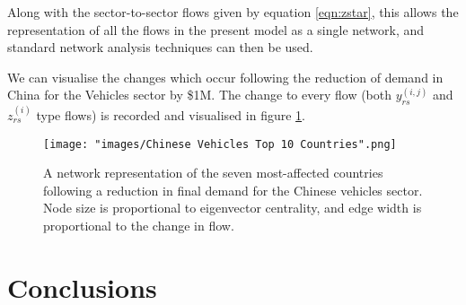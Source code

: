 \documentclass[a4paper]{article}
\begin{document}
Along with the sector-to-sector flows given by equation \eqref{eqn:zstar}, this allows the representation of all the flows in the present model as a single network, and standard network analysis techniques can then be used.

We can visualise the changes which occur following the reduction of demand in China for the Vehicles sector by \$1M. The change to every flow (both $y_{rs}^{(i,j)}$ and $z_{rs}^{(i)}$ type flows) is recorded and visualised in figure \ref{fig:chnvehtop6}.

\begin{figure}
\centering
\texttt{[image: "images/Chinese Vehicles Top 10 Countries".png]}
\caption{A network representation of the seven most-affected countries following a reduction in final demand for the Chinese vehicles sector. Node size is proportional to eigenvector centrality, and edge width is proportional to the change in flow.}\label{fig:chnvehtop6}
\end{figure}


\section{Conclusions}\label{sec:conclusions}

\printbibliography
\end{document}

